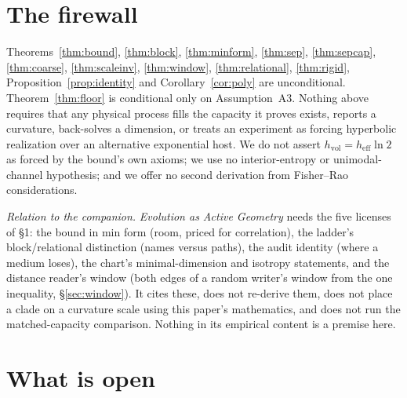 \documentclass[11pt,reqno]{amsart}
\theoremstyle{plain}
\theoremstyle{definition}
\newcommand{\hvol}{h_{\mathrm{vol}}}
\newcommand{\heff}{h_{\mathrm{eff}}}
\begin{document}
\section{The firewall}\label{sec:firewall}

Theorems~\ref{thm:bound}, \ref{thm:block}, \ref{thm:minform}, \ref{thm:sep}, \ref{thm:sepcap}, \ref{thm:coarse}, \ref{thm:scaleinv}, \ref{thm:window}, \ref{thm:relational}, \ref{thm:rigid}, Proposition~\ref{prop:identity} and Corollary~\ref{cor:poly} are unconditional. Theorem~\ref{thm:floor} is conditional only on Assumption~A3. Nothing above requires that any physical process fills the capacity it proves exists, reports a curvature, back-solves a dimension, or treats an experiment as forcing hyperbolic realization over an alternative exponential host. We do not assert $\hvol=\heff\ln2$ as forced by the bound's own axioms; we use no interior-entropy or unimodal-channel hypothesis; and we offer no second derivation from Fisher--Rao considerations.

\emph{Relation to the companion.} \emph{Evolution as Active Geometry} needs the five licenses of \S1: the bound in min form (room, priced for correlation), the ladder's block/relational distinction (names versus paths), the audit identity (where a medium loses), the chart's minimal-dimension and isotropy statements, and the distance reader's window (both edges of a random writer's window from the one inequality, \S\ref{sec:window}). It cites these, does not re-derive them, does not place a clade on a curvature scale using this paper's mathematics, and does not run the matched-capacity comparison. Nothing in its empirical content is a premise here.

\section{What is open}\label{sec:open}
\end{document}
